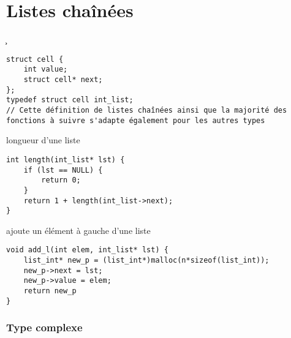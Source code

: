 \section{Listes chaînées}
\c
\begin{tp*}{}
\begin{verbatim}
struct cell {
    int value;
    struct cell* next;
};
typedef struct cell int_list;
// Cette définition de listes chaînées ainsi que la majorité des fonctions à suivre s'adapte également pour les autres types
\end{verbatim}
\end{tp*}
\begin{fnc*}{longueur d'une liste}
\begin{verbatim}
int length(int_list* lst) {
    if (lst == NULL) {
        return 0;
    }
    return 1 + length(int_list->next);
}
\end{verbatim}
\end{fnc*}
\begin{fnc*}{ajoute un élément à gauche d'une liste}
\begin{verbatim}
void add_l(int elem, int_list* lst) {
    list_int* new_p = (list_int*)malloc(n*sizeof(list_int));
    new_p->next = lst;
    new_p->value = elem;
    return new_p
}
\end{verbatim}
\end{fnc*}
\ocaml
\subsubsection{Type complexe}
